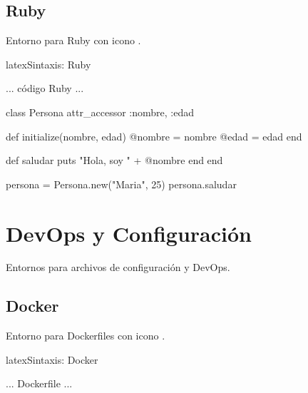 
\subsection{Ruby}

Entorno para Ruby con icono .

\begin{codigosimple}{latex}{Sintaxis: Ruby}
\begin{rubycode}
  ... código Ruby ...
\end{rubycode}
\end{codigosimple}

\begin{rubycode}
class Persona
  attr_accessor :nombre, :edad

  def initialize(nombre, edad)
    @nombre = nombre
    @edad = edad
  end

  def saludar
    puts "Hola, soy " + @nombre
  end
end

persona = Persona.new("Maria", 25)
persona.saludar
\end{rubycode}

\section{DevOps y Configuración}
\label{sec:devops}

Entornos para archivos de configuración y DevOps.

\subsection{Docker}

Entorno para Dockerfiles con icono .

\begin{codigosimple}{latex}{Sintaxis: Docker}
\begin{dockercode}
  ... Dockerfile ...
\end{dockercode}
\end{codigosimple}

